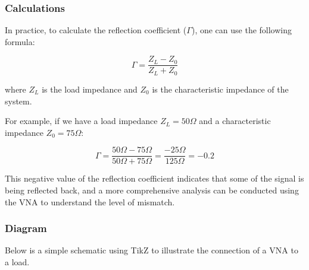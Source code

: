 \subsubsection{Calculations}

In practice, to calculate the reflection coefficient ($\Gamma$), one can use the following formula:

\[
\Gamma = \frac{Z_L - Z_0}{Z_L + Z_0}
\]

where \(Z_L\) is the load impedance and \(Z_0\) is the characteristic impedance of the system. 

For example, if we have a load impedance \(Z_L = 50 \Omega\) and a characteristic impedance \(Z_0 = 75 \Omega\):

\[
\Gamma = \frac{50 \Omega - 75 \Omega}{50 \Omega + 75 \Omega} = \frac{-25 \Omega}{125 \Omega} = -0.2
\]

This negative value of the reflection coefficient indicates that some of the signal is being reflected back, and a more comprehensive analysis can be conducted using the VNA to understand the level of mismatch.

\subsubsection{Diagram}

Below is a simple schematic using TikZ to illustrate the connection of a VNA to a load.

\begin{center}
\end{center}
